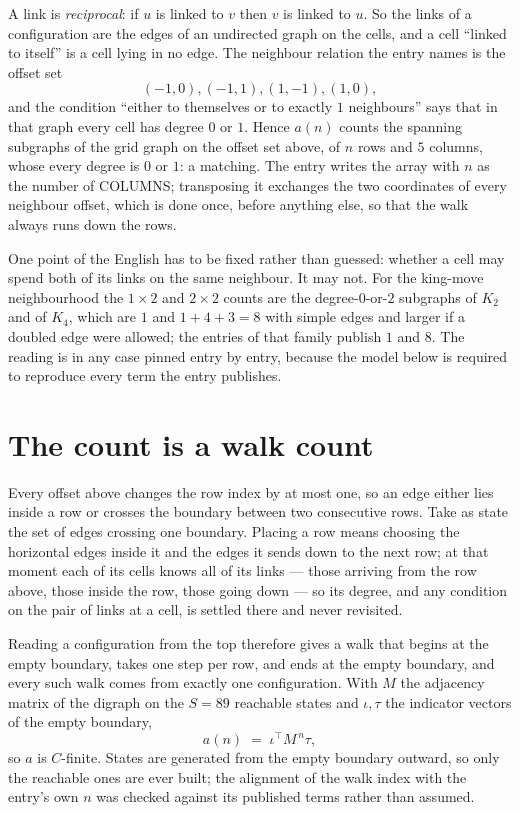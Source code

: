 \documentclass[11pt,a4paper]{article}
\theoremstyle{plain}
\theoremstyle{definition}
\begin{document}
A link is \emph{reciprocal}: if $u$ is linked to $v$ then $v$ is linked to $u$. So the links
of a configuration are the edges of an undirected graph on the cells, and a cell ``linked to
itself'' is a cell lying in no edge. The neighbour relation the entry names is the offset set
\[
(-1,0), (-1,1), (1,-1), (1,0),
\]
and the condition ``either to themselves or to exactly $1$ neighbours'' says that in that
graph every cell has degree $0$ or $1$. Hence $a(n)$ counts the spanning subgraphs of the
grid graph on the offset set above, of $n$ rows and $5$ columns,
whose every degree is $0$ or $1$: a matching. The entry writes the array with $n$ as the number of COLUMNS; transposing it exchanges the two coordinates of every neighbour offset, which is done once, before anything else, so that the walk always runs down the rows.

One point of the English has to be fixed rather than guessed: whether a cell may spend both of
its links on the same neighbour. It may not. For the king-move neighbourhood the $1\times2$
and $2\times2$ counts are the degree-$0$-or-$2$ subgraphs of $K_2$ and of $K_4$, which are $1$
and $1+4+3=8$ with simple edges and larger if a doubled edge were allowed; the entries of that
family publish $1$ and $8$. The reading is in any case pinned entry by entry, because the
model below is required to reproduce every term the entry publishes.


\section{The count is a walk count}

Every offset above changes the row index by at most one, so an edge either lies inside a row
or crosses the boundary between two consecutive rows. Take as state the set of edges crossing
one boundary. Placing a row means choosing the horizontal edges inside it and the edges it
sends down to the next row; at that moment each of its cells knows all of its links --- those
arriving from the row above, those inside the row, those going down --- so its degree, and any
condition on the pair of links at a cell, is settled there and never revisited.

Reading a configuration from the top therefore gives a walk that begins at the empty boundary,
takes one step per row, and ends at the empty boundary, and every such walk comes from exactly
one configuration. With $M$ the adjacency matrix of the digraph on the $S=89$ reachable
states and $\iota,\tau$ the indicator vectors of the empty boundary,
\[
a(n)\;=\;\iota^{\!\top}M^{\,n}\tau ,
\]
so $a$ is $C$-finite. States are generated from the empty boundary outward, so only the
reachable ones are ever built; the alignment of the walk index with the entry's own $n$ was
checked against its published terms rather than assumed.
\end{document}
